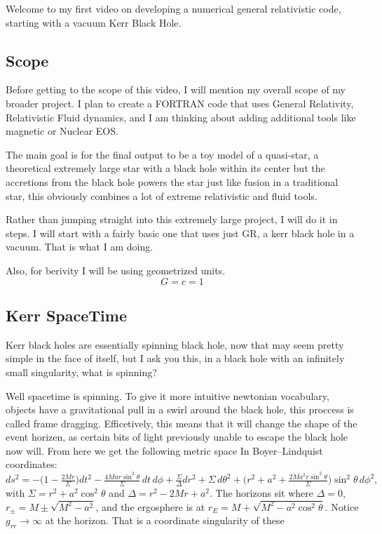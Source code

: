 Welcome to my first video on developing a numerical general relativistic code, starting with a vacuum Kerr Black Hole.

\subsection{Scope}

Before getting to the scope of this video, I will mention my overall scope of my broader project. I plan to create a FORTRAN code that uses General Relativity, Relativistic Fluid dynamics, and I am thinking about adding additional tools like magnetic or Nuclear EOS.

The main goal is for the final output to be a toy model of a quasi-star, a theoretical extremely large star with a black hole within its center but the accretions from the black hole powers the star just like fusion in a traditional star, this obviously combines a lot of extreme relativistic and fluid tools.

Rather than jumping straight into this extremely large project, I will do it in steps. I will start with a fairly basic one that uses just GR, a kerr black hole in a vacuum. That is what I am doing.

Also, for berivity I will be using geometrized units.
\[
	G = c = 1
\]

\subsection{Kerr SpaceTime}

Kerr black holes are essentially spinning black hole, now that may seem pretty simple in the face of itself, but I ask you this, in a black hole with an infinitely small singularity, what is spinning?

Well spacetime is spinning. To give it more intuitive newtonian vocabulary, objects have a gravitational pull in a swirl around the black hole, this proccess is called frame dragging. Efficetively, this means that it will change the shape of the event horizen, as certain bits of light previously unable to escape the black hole now will. From here we get the following metric space In Boyer--Lindquist coordinates:
\[
	ds^2 = -\Big(1-\tfrac{2Mr}{\Sigma}\Big)dt^2 - \tfrac{4Mar\sin^2\theta}{\Sigma}\,dt\,d\phi
	+ \tfrac{\Sigma}{\Delta}dr^2 + \Sigma\,d\theta^2
	+ \Big(r^2+a^2+\tfrac{2Ma^2r\sin^2\theta}{\Sigma}\Big)\sin^2\theta\,d\phi^2,
\]
with $\Sigma=r^2+a^2\cos^2\theta$ and $\Delta=r^2-2Mr+a^2$. The horizons sit where $\Delta=0$,
$r_\pm = M\pm\sqrt{M^2-a^2}$, and the ergosphere is at $r_E=M+\sqrt{M^2-a^2\cos^2\theta}$.
Notice $g_{rr}\to\infty$ at the horizon. That is a coordinate singularity of these

